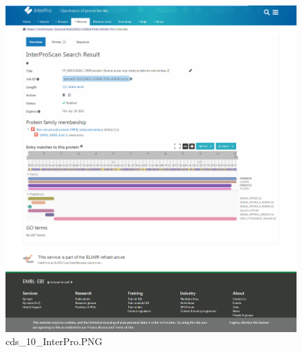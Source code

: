\documentclass[supercite]{HustGraduPaper}
\begin{document}
	\begin{figure}[H]
		\centering
		\includegraphics[width=1\textwidth]{./material/practice2/cds_10/InterPro.png}
		\caption{cds\_10\_InterPro.PNG}
	\end{figure}
\end{document}
